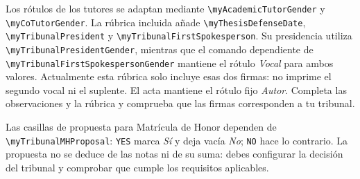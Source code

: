 \documentclass[10pt,a4paper]{article}
\newcommand{\variable}[1]{\texttt{\textbackslash{}}\nolinkurl{#1}}
\begin{document}
Los rótulos de los tutores se adaptan mediante \variable{myAcademicTutorGender} y \variable{myCoTutorGender}. La rúbrica incluida añade \variable{myThesisDefenseDate}, \variable{myTribunalPresident} y \variable{myTribunalFirstSpokesperson}. Su presidencia utiliza \variable{myTribunalPresidentGender}, mientras que el comando dependiente de \variable{myTribunalFirstSpokespersonGender} mantiene el rótulo \emph{Vocal} para ambos valores. Actualmente esta rúbrica solo incluye esas dos firmas: no imprime el segundo vocal ni el suplente. El acta mantiene el rótulo fijo \emph{Autor}. Completa las observaciones y la rúbrica y comprueba que las firmas corresponden a tu tribunal.

Las casillas de propuesta para Matrícula de Honor dependen de \variable{myTribunalMHProposal}: \texttt{YES} marca \emph{Sí} y deja vacía \emph{No}; \texttt{NO} hace lo contrario. La propuesta no se deduce de las notas ni de su suma: debes configurar la decisión del tribunal y comprobar que cumple los requisitos aplicables.
\end{document}
